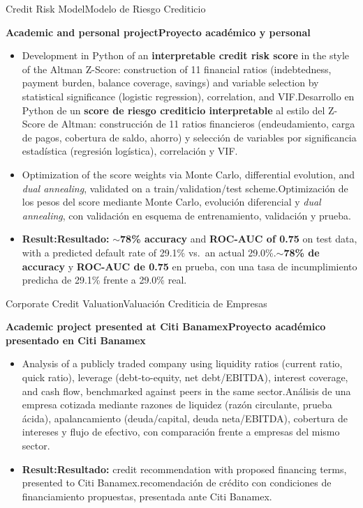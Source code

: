 \documentclass[10pt,a4paper,withhyper]{altacv}
\newcommand{\tr}[2]{\ifEN #2\else #1\fi}
\renewcommand{\cvevent}[4]{%
  \Needspace{6\baselineskip}%
  {\large\color{emphasis}#1\par}
  \smallskip\normalsize
  \ifstrequal{#2}{}{}{%
  \textbf{\color{accent}#2}\par
  \smallskip}%
  \ifstrequal{#3}{}{}{%
    {\small\makebox[0.5\linewidth][l]%
      {\BeginAccSupp{method=pdfstringdef,ActualText={\datename:}}\cvDateMarker\EndAccSupp{}~#3}%
    }}%
  \ifstrequal{#4}{}{}{%
    {\small\makebox[0.5\linewidth][l]%
      {\BeginAccSupp{method=pdfstringdef,ActualText={\locationname:}}\cvLocationMarker\EndAccSupp{}~#4}%
    }}\par
  \smallskip\normalsize
}
\renewcommand{\divider}{\smallskip\textcolor{body!30}{\hdashrule{\linewidth}{0.6pt}{0.5ex}}\smallskip}
\begin{document}
\divider

\cvevent{\tr{Modelo de Riesgo Crediticio}{Credit Risk Model}}{\tr{Proyecto académico y personal}{Academic and personal project}}{}{}
\begin{itemize}
\item \tr{Desarrollo en Python de un \textbf{score de riesgo crediticio interpretable} al estilo del Z-Score de Altman: construcción de 11 ratios financieros (endeudamiento, carga de pagos, cobertura de saldo, ahorro) y selección de variables por significancia estadística (regresión logística), correlación y VIF.}{Development in Python of an \textbf{interpretable credit risk score} in the style of the Altman Z-Score: construction of 11 financial ratios (indebtedness, payment burden, balance coverage, savings) and variable selection by statistical significance (logistic regression), correlation, and VIF.}
\item \tr{Optimización de los pesos del score mediante Monte Carlo, evolución diferencial y \textit{dual annealing}, con validación en esquema de entrenamiento, validación y prueba.}{Optimization of the score weights via Monte Carlo, differential evolution, and \textit{dual annealing}, validated on a train/validation/test scheme.}
\item \textbf{\tr{Resultado:}{Result:}} \tr{\textbf{$\sim$78\% de accuracy} y \textbf{ROC-AUC de 0.75} en prueba, con una tasa de incumplimiento predicha de 29.1\% frente a 29.0\% real.}{\textbf{$\sim$78\% accuracy} and \textbf{ROC-AUC of 0.75} on test data, with a predicted default rate of 29.1\% vs.\ an actual 29.0\%.}
\end{itemize}

\divider

\cvevent{\tr{Valuación Crediticia de Empresas}{Corporate Credit Valuation}}{\tr{Proyecto académico presentado en Citi Banamex}{Academic project presented at Citi Banamex}}{}{}
\begin{itemize}
\item \tr{Análisis de una empresa cotizada mediante razones de liquidez (razón circulante, prueba ácida), apalancamiento (deuda/capital, deuda neta/EBITDA), cobertura de intereses y flujo de efectivo, con comparación frente a empresas del mismo sector.}{Analysis of a publicly traded company using liquidity ratios (current ratio, quick ratio), leverage (debt-to-equity, net debt/EBITDA), interest coverage, and cash flow, benchmarked against peers in the same sector.}
\item \textbf{\tr{Resultado:}{Result:}} \tr{recomendación de crédito con condiciones de financiamiento propuestas, presentada ante Citi Banamex.}{credit recommendation with proposed financing terms, presented to Citi Banamex.}
\end{itemize}
\end{document}
